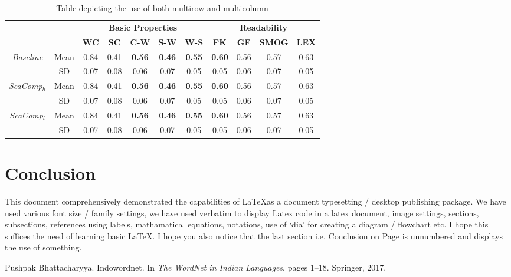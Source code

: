 \documentclass[titlepage,11pt]{article}
\begin{document}
\begin{table}[h]
\centering
\caption{Table depicting the use of both multirow and multicolumn}
\begin{tabular}{c c|c|c|c|c|c|c|c|c|c|}
\cline{3-11}
& & \multicolumn{5}{c|}{\textbf{Basic Properties}} & \multicolumn{4}{c|}{\textbf{Readability}} \\ \cline{3-11}
& & \multicolumn{1}{|c|}{\textbf{WC}} & \textbf{SC} & \textbf{C-W} & \textbf{S-W} & \textbf{W-S} & \textbf{FK} & \textbf{GF} & \textbf{SMOG} & \textbf{LEX}\\ \cline{1-11}
\multicolumn{1}{|c|}{\multirow{2}{*}{\textit{Baseline}}} & Mean & 0.84 & 0.41 & \textbf{0.56} & \textbf{0.46} & \textbf{0.55} & \textbf{0.60} & 0.56 & 0.57 & 0.63\\ \cline{2-11}
\multicolumn{1}{|c|}{} & SD & 0.07 & 0.08 & 0.06 & 0.07 & 0.05 & 0.05 & 0.06 & 0.07 & 0.05\\ 
\hline \hline
 \multicolumn{1}{|c|}{\multirow{2}{*}{\textit{ScaComp$_{h}$}}} & Mean & 0.84 & 0.41 & \textbf{0.56} & \textbf{0.46} & \textbf{0.55} & \textbf{0.60} & 0.56 & 0.57 & 0.63\\ \cline{2-11}
\multicolumn{1}{|c|}{} & SD & 0.07 & 0.08 & 0.06 & 0.07 & 0.05 & 0.05 & 0.06 & 0.07 & 0.05\\ 
\hline \hline
\multicolumn{1}{|c|}{\multirow{2}{*}{\textit{ScaComp$_{l}$}}} & Mean & 0.84 & 0.41 & \textbf{0.56} & \textbf{0.46} & \textbf{0.55} & \textbf{0.60} & 0.56 & 0.57 & 0.63\\ \cline{2-11}
\multicolumn{1}{|c|}{} & SD & 0.07 & 0.08 & 0.06 & 0.07 & 0.05 & 0.05 & 0.06 & 0.07 & 0.05\\ 
\hline
\end{tabular}
\end{table}


\section*{Conclusion} \label{end}
This document comprehensively demonstrated the capabilities of \LaTeX as a document typesetting / desktop publishing package. We have used various font size / family settings, we have used verbatim to display Latex code in a latex document, image settings, sections, subsections, references using labels, mathamatical equations, notations, use of ‘dia’ for creating a diagram / flowchart etc. I hope this suffices the need of learning basic \LaTeX. I hope you also notice that the last section i.e. Conclusion on Page \pageref{end} is unnumbered and displays the use of something.

\begin{thebibliography}{9}
Pushpak Bhattacharyya. Indowordnet. In \textit{The WordNet in Indian
Languages}, pages 1–18. Springer, 2017.
\end{thebibliography}
\end{document}
